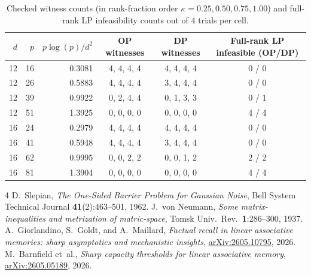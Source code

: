 \documentclass[11pt]{article}
\theoremstyle{plain}
\theoremstyle{definition}
\theoremstyle{remark}
\begin{document}
\begin{table}[ht]
\centering
\caption{Checked witness counts (in rank-fraction order $\kappa = 0.25, 0.50, 0.75, 1.00$) and full-rank LP infeasibility counts out of $4$ trials per cell.}
\label{tab:sweep}
\small
\begin{tabular}{@{}rrrccc@{}}
\toprule
$d$ & $p$ & $p\log(p)/d^2$ & \textup{OP} witnesses & \textup{DP} witnesses & Full-rank LP infeasible (\textup{OP}/\textup{DP}) \\
\midrule
12 & 16 & 0.3081 & 4, 4, 4, 4 & 4, 4, 4, 4 & 0 / 0 \\
12 & 26 & 0.5883 & 4, 4, 4, 4 & 3, 4, 4, 4 & 0 / 0 \\
12 & 39 & 0.9922 & 0, 2, 4, 4 & 0, 1, 3, 3 & 0 / 1 \\
12 & 51 & 1.3925 & 0, 0, 0, 0 & 0, 0, 0, 0 & 4 / 4 \\
16 & 24 & 0.2979 & 4, 4, 4, 4 & 4, 4, 4, 4 & 0 / 0 \\
16 & 41 & 0.5948 & 4, 4, 4, 4 & 3, 4, 4, 4 & 0 / 0 \\
16 & 62 & 0.9995 & 0, 0, 2, 2 & 0, 0, 1, 2 & 2 / 2 \\
16 & 81 & 1.3904 & 0, 0, 0, 0 & 0, 0, 0, 0 & 4 / 4 \\
\bottomrule
\end{tabular}
\end{table}

\begin{thebibliography}{4}
D.~Slepian, \emph{The One-Sided Barrier Problem for Gaussian Noise}, Bell System Technical Journal \textbf{41}(2):463--501, 1962.
J.~von Neumann, \emph{Some matrix-inequalities and metrization of matric-space}, Tomsk Univ.\ Rev.\ \textbf{1}:286--300, 1937.
A.~Giorlandino, S.~Goldt, and A.~Maillard, \emph{Factual recall in linear associative memories: sharp asymptotics and mechanistic insights}, \href{https://arxiv.org/abs/2605.10795}{arXiv:2605.10795}, 2026.
M.~Barnfield et~al., \emph{Sharp capacity thresholds for linear associative memory}, \href{https://arxiv.org/abs/2605.05189}{arXiv:2605.05189}, 2026.
\end{thebibliography}
\end{document}
